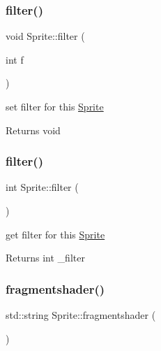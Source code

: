 \subsubsection{\texorpdfstring{filter()}{filter()}\hspace{0.1cm}{\footnotesize\ttfamily [1/2]}}
{\footnotesize\ttfamily void Sprite\+::filter (\begin{DoxyParamCaption}\item[{int}]{f }\end{DoxyParamCaption})\hspace{0.3cm}{\ttfamily [inline]}}



set filter for this \hyperlink{class_sprite}{Sprite} 

\begin{DoxyReturn}{Returns}
void 
\end{DoxyReturn}
\mbox{\label{class_sprite_a7c183f627af8bf9d416189f4dc81383b}} 
\subsubsection{\texorpdfstring{filter()}{filter()}\hspace{0.1cm}{\footnotesize\ttfamily [2/2]}}
{\footnotesize\ttfamily int Sprite\+::filter (\begin{DoxyParamCaption}{ }\end{DoxyParamCaption})\hspace{0.3cm}{\ttfamily [inline]}}



get filter for this \hyperlink{class_sprite}{Sprite} 

\begin{DoxyReturn}{Returns}
int \+\_\+filter 
\end{DoxyReturn}
\mbox{\label{class_sprite_a62f75a2c234025b6cfc6525bd4ae1da8}} 
\subsubsection{\texorpdfstring{fragmentshader()}{fragmentshader()}\hspace{0.1cm}{\footnotesize\ttfamily [1/2]}}
{\footnotesize\ttfamily std\+::string Sprite\+::fragmentshader (\begin{DoxyParamCaption}{ }\end{DoxyParamCaption})\hspace{0.3cm}{\ttfamily [inline]}}



